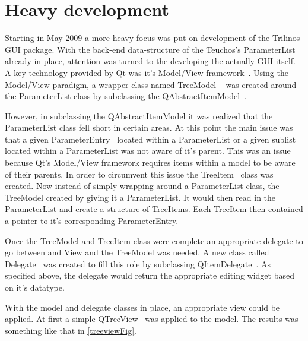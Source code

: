 \section{Heavy development}
Starting in May 2009 a more heavy focus was put on development of the Trilinos GUI package.
With the back-end data-structure of the Teuchos's ParameterList already in place, attention
was turned to the developing the actually GUI itself. A key technology provided by Qt was it's Model/View
framework~\cite{QtModelView}. Using the Model/View paradigm, a wrapper class named TreeModel
~\cite{TreeModel} was created around the ParameterList class by subclassing the 
QAbstractItemModel~\cite{QAbstractItemModel}.

However, in subclassing the QAbstractItemModel it was realized that the ParameterList class fell short in
certain areas. At this point the main issue was that a given ParameterEntry~\cite{ParameterEntry} located within
a ParameterList or a given sublist located within a ParameterList was not aware of it's parent.
This was an issue because Qt's Model/View framework requires items within a model to be aware of
their parents. In order to circumvent this issue the TreeItem~\cite{TreeItem} class was created. Now 
instead of simply wrapping around a ParameterList class, the TreeModel created by giving it a ParameterList.
It would then read in the ParameterList and create a structure of TreeItems.  Each TreeItem then contained a pointer 
to it's corresponding ParameterEntry.

Once the TreeModel and TreeItem class were complete an appropriate delegate to go between and View
and the TreeModel was needed. A new class called Delegate~\cite{Delegate} was created to fill this
role by subclassing QItemDelegate~\cite{QItemDelegate}. As specified above, the delegate would return
the appropriate editing widget based on it's datatype.

With the model and delegate classes in place, an appropriate view could be applied. At first a simple
QTreeView~\cite{QTreeView} was applied to the model. The results was something like that in \ref{treeviewFig}.
	\begin{figure}[h]
		\centering
	\end{figure}

